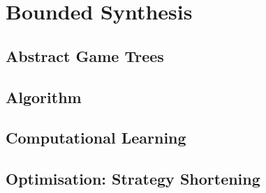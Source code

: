 \chapter{Bounded Synthesis}

\section{Abstract Game Trees}

\section{Algorithm}

\section{Computational Learning}

\section{Optimisation: Strategy Shortening}
